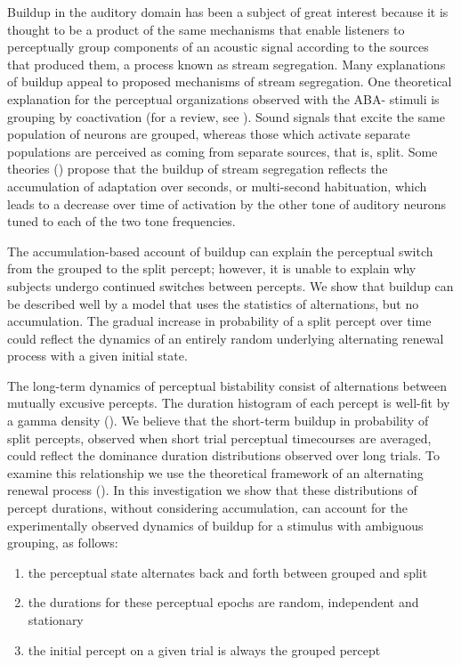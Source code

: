 \documentclass{frontiersSCNS} %
\begin{document}
Buildup in the auditory domain has been a subject of great interest because it is thought to be a product of the same mechanisms that enable listeners to perceptually group components of an acoustic signal according to the sources that produced them, a process known as stream segregation. Many explanations of buildup appeal to proposed mechanisms of stream segregation. One theoretical explanation for the perceptual organizations observed with the ABA- stimuli is grouping by coactivation (for a review, see \cite{Carlyon2004}). Sound signals that excite the same population of neurons are grouped, whereas those which activate separate populations are perceived as coming from separate sources, that is, split. Some theories (\cite{Micheyl2005,Pressnitzer2008,Bee2010}) propose that the buildup of stream segregation reflects the accumulation of adaptation over seconds, or multi-second habituation, which leads to a decrease over time of activation by the other tone of auditory neurons tuned to each of the two tone frequencies.  %

The accumulation-based account of buildup can explain the perceptual switch from the grouped to the split percept; however, it is unable to explain why subjects undergo continued switches between percepts. We show that buildup can be described well by a model that uses the statistics of alternations, but no accumulation. The gradual increase in probability of a split percept over time could reflect the dynamics of an entirely random underlying alternating renewal process with a given initial state.

The long-term dynamics of perceptual bistability consist of alternations between mutually excusive percepts. The duration histogram of each percept is well-fit by a gamma density (\cite{Shpiro2009, Pressnitzer2006}). We believe that the short-term buildup in probability of split percepts, observed when short trial perceptual timecourses are averaged, could reflect the dominance duration distributions observed over long trials. To examine this relationship we use the theoretical framework of an alternating renewal process (\cite{}). In this investigation we show that these distributions of percept durations, without considering accumulation, can account for the experimentally observed dynamics of buildup for a stimulus with ambiguous grouping, as follows:

\begin{enumerate}
\item the perceptual state alternates back and forth between grouped and split
\item the durations for these perceptual epochs are random, independent and stationary
\item the initial percept on a given trial is always the grouped percept
\end{enumerate}
\end{document}
